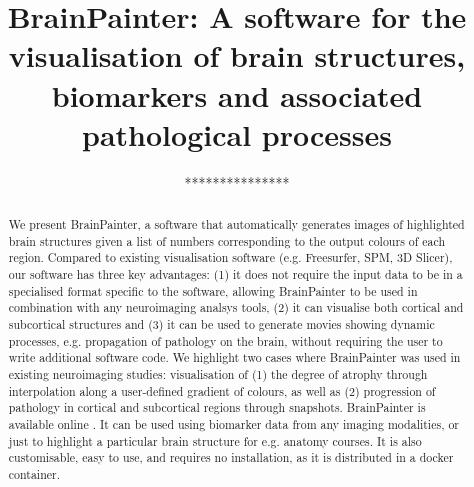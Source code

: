 \documentclass{llncs}
\begin{document}
\title{BrainPainter: A software for the visualisation of brain structures, biomarkers and associated pathological processes}
%
%


\author{***************}

\authorrunning{} %

\institute{***************}



\maketitle              %


\newcommand{\expFld}{.}


\begin{abstract}
We present BrainPainter, a software that automatically generates images of highlighted brain structures given a list of numbers corresponding to the output colours of each region. Compared to existing visualisation software (e.g. Freesurfer, SPM, 3D Slicer), our software has three key advantages: (1) it does not require the input data to be in a specialised format specific to the software, allowing BrainPainter to be used in combination with any neuroimaging analsys tools, (2) it can visualise both cortical and subcortical structures and (3) it can be used to generate movies showing dynamic processes, e.g. propagation of pathology on the brain, without requiring the user to write additional software code. We highlight two cases where BrainPainter was used in existing neuroimaging studies: visualisation of (1) the degree of atrophy through interpolation along a user-defined gradient of colours, as well as (2) progression of pathology in cortical and subcortical regions through snapshots. BrainPainter is available online \cite{brainPainter}. It can be used using biomarker data from any imaging modalities, or just to highlight a particular brain structure for e.g. anatomy courses. It is also customisable, easy to use, and requires no installation, as it is distributed in a docker container.

\end{abstract}
\end{document}
